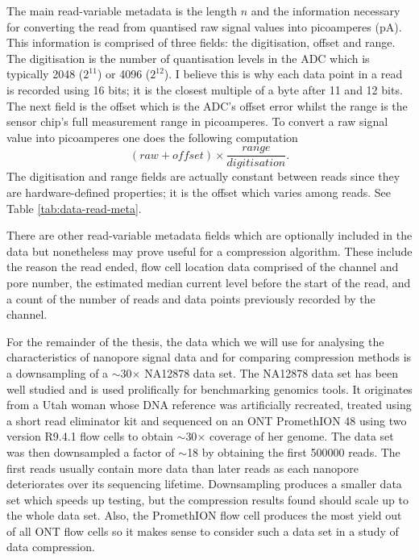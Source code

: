 The main read-variable metadata is the length $n$ and the information necessary for converting the read from quantised raw signal values into picoamperes (pA). This information is comprised of three fields: the digitisation, offset and range. The digitisation is the number of quantisation levels in the ADC which is typically 2048 ($2^{11}$) or 4096 ($2^{12}$). I believe this is why each data point in a read is recorded using 16 bits; it is the closest multiple of a byte after 11 and 12 bits. The next field is the offset which is the ADC's offset error whilst the range is the sensor chip's full measurement range in picoamperes. To convert a raw signal value into picoamperes one does the following computation
\begin{equation}(raw + offset) \times \frac{range}{digitisation}. \label{eq:pa}\end{equation}
The digitisation and range fields are actually constant between reads since they are hardware-defined properties; it is the offset which varies among reads. See Table \ref{tab:data-read-meta}.

There are other read-variable metadata fields which are optionally included in the data but nonetheless may prove useful for a compression algorithm. These include the reason the read ended, flow cell location data comprised of the channel and pore number, the estimated median current level before the start of the read, and a count of the number of reads and data points previously recorded by the channel.

For the remainder of the thesis, the data which we will use for analysing the characteristics of nanopore signal data and for comparing compression methods is a downsampling of a $\sim$30$\times$ NA12878 data set. The NA12878 data set has been well studied and is used prolifically for benchmarking genomics tools. It originates from a Utah woman whose DNA reference was artificially recreated, treated using a short read eliminator kit and sequenced on an ONT PromethION 48 using two version R9.4.1 flow cells to obtain $\sim$30$\times$ coverage of her genome.
The data set was then downsampled a factor of $\sim$18 by obtaining the first \num{500000} reads.
The first reads usually contain more data than later reads as each nanopore deteriorates over its sequencing lifetime.
Downsampling produces a smaller data set which speeds up testing, but the compression results found should scale up to the whole data set.
Also, the PromethION flow cell produces the most yield out of all ONT flow cells so it makes sense to consider such a data set in a study of data compression.

